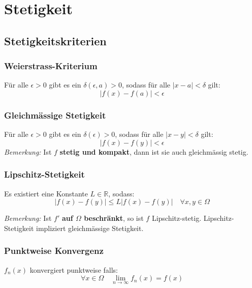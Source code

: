 \documentclass[11pt]{article}
\begin{document}
\section{Stetigkeit}

\subsection{Stetigkeitskriterien}

\subsubsection*{Weierstrass-Kriterium}
Für alle $\epsilon > 0$ gibt es ein $\delta(\epsilon, a) >0$, sodass für alle $|x-a|<\delta$ gilt:
\begin{equation*}
	|f(x) -f(a)|<\epsilon
\end{equation*}

\subsubsection*{Gleichmässige Stetigkeit}
Für alle $\epsilon > 0$ gibt es ein $\delta(\epsilon) >0$, sodass für alle $|x-y|<\delta$ gilt:
\begin{equation*}
	|f(x)-f(y)| < \epsilon
\end{equation*}
\emph{Bemerkung:} Ist $f$ \textbf{stetig und kompakt}, dann ist sie auch gleichmässig stetig.

\subsubsection*{Lipschitz-Stetigkeit}
Es existiert eine Konstante $L\in \mathbb{R}$, sodass:
\begin{equation*}
	|f(x)-f(y)|\leq L|f(x)-f(y)| \quad \forall x,y \in \Omega
\end{equation*}

\emph{Bemerkung:} Ist $f'$ \textbf{auf $\Omega$ beschränkt}, so ist $f$ Lipschitz-stetig. Lipschitz-Stetigkeit impliziert gleichmässige Stetigkeit.

\subsubsection*{Punktweise Konvergenz}
$f_n(x)$ konvergiert punktweise falls:
\begin{equation*}
	\forall x\in \Omega \quad \lim_{n\rightarrow\infty}f_n(x) = f(x)
\end{equation*}
\end{document}
